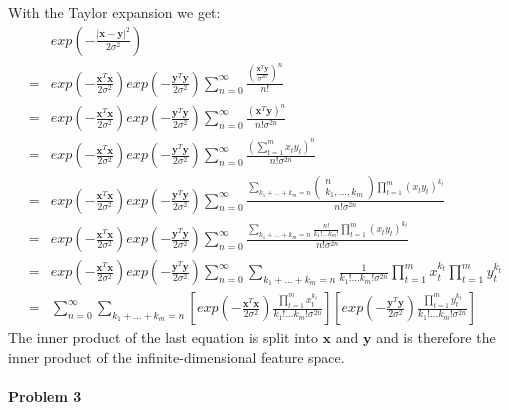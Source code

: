 \documentclass{article}
\renewcommand{\Vec}[1]{\ensuremath{\mathbf{#1}}}
\begin{document}
With the Taylor expansion we get:
\begin{eqnarray}
&&exp(-\frac{|\Vec{x}-\Vec{y}|^2}{2 \sigma^2})\\
&=& exp\left( -\frac{\Vec{x}^T\Vec{x}}{2 \sigma^2}\right) exp\left( -\frac{\Vec{y}^T\Vec{y}}{2 \sigma^2}\right) \sum_{n=0}^{\infty}\frac{\left(\frac{\Vec{x}^T\Vec{y}}{\sigma^{2n}} \right)^n}{n!}\\
&=& exp\left( -\frac{\Vec{x}^T\Vec{x}}{2 \sigma^2}\right) exp\left( -\frac{\Vec{y}^T\Vec{y}}{2 \sigma^2}\right) \sum_{n=0}^{\infty}\frac{\left(\Vec{x}^T\Vec{y} \right)^n}{n!\sigma^{2n}}\\
&=& exp\left( -\frac{\Vec{x}^T\Vec{x}}{2 \sigma^2}\right) exp\left( -\frac{\Vec{y}^T\Vec{y}}{2 \sigma^2}\right) \sum_{n=0}^{\infty}\frac{\left(\sum_{t=1}^m x_t y_t \right)^n}{n!\sigma^{2n}}\\
&=& exp\left( -\frac{\Vec{x}^T\Vec{x}}{2 \sigma^2}\right) exp\left( -\frac{\Vec{y}^T\Vec{y}}{2 \sigma^2}\right) \sum_{n=0}^{\infty}\frac{\sum_{k_1+...+k_m = n} \left(\begin{array}{c}
n\\k_1,...,k_m
\end{array}\right) \prod_{t=1}^m(x_t y_t)^{k_t}}{n!\sigma^{2n}}\\
&=& exp\left( -\frac{\Vec{x}^T\Vec{x}}{2 \sigma^2}\right) exp\left( -\frac{\Vec{y}^T\Vec{y}}{2 \sigma^2}\right) \sum_{n=0}^{\infty}\frac{\sum_{k_1+...+k_m = n} \frac{n!}{k_1!...k_m!} \prod_{t=1}^m(x_t y_t)^{k_t}}{n!\sigma^{2n}}\\
&=& exp\left( -\frac{\Vec{x}^T\Vec{x}}{2 \sigma^2}\right) exp\left( -\frac{\Vec{y}^T\Vec{y}}{2 \sigma^2}\right) \sum_{n=0}^{\infty}\sum_{k_1+...+k_m = n} \frac{1}{k_1!...k_m!\sigma^{2n}} \prod_{t=1}^m x_t^{k_t} \prod_{t=1}^m y_t^{k_t}\\
&=& \sum_{n=0}^{\infty}\sum_{k_1+...+k_m = n} \left[exp\left( -\frac{\Vec{x}^T\Vec{x}}{2 \sigma^2}\right) \frac{\prod_{t=1}^m x_t^{k_t}}{k_1!...k_m!\sigma^{2n}}\right] \left[exp\left( -\frac{\Vec{y}^T\Vec{y}}{2 \sigma^2}\right) \frac{ \prod_{t=1}^m y_t^{k_t}}{k_1!...k_m!\sigma^{2n}}\right]
\end{eqnarray}
The inner product of the last equation is split into $\Vec{x}$ and $\Vec{y}$ and is therefore the inner product of the infinite-dimensional feature space.


\paragraph*{Problem 3}
$\;$ 
\end{document}
